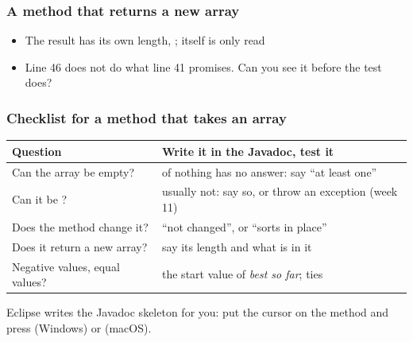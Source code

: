 \documentclass[aspectratio=169,10pt,compress]{beamer}
\begin{document}
\begin{frame}[t,fragile] \frametitle{A method that returns a new array}

	\begin{itemize}\small
		\item The result has its own length, ;  itself is only read
		\item Line 46 does not do what line 41 promises. Can you see it before the test does?
	\end{itemize}
\end{frame}




\begin{frame}[t,fragile] \frametitle{Checklist for a method that takes an array}


\begin{table}
		\small
		\begin{tabular}{@{}L{0.40\textwidth}L{0.52\textwidth}@{}}
			\toprule
			\textbf{Question} & \textbf{Write it in the Javadoc, test it} \\
			\midrule
			Can the array be empty?            &  of nothing has no answer: say ``at least one'' \\
			Can it be ?            & usually not: say so, or throw an exception (week 11) \\
			Does the method change it?         & ``not changed'', or ``sorts  in place'' \\
			Does it return a new array?        & say its length and what is in it \\
			Negative values, equal values?     & the start value of \emph{best so far}; ties \\
			\bottomrule
		\end{tabular}
\end{table}%


	\vspace{0.5em}
	\small Eclipse writes the Javadoc skeleton for you: put the cursor on the method and press
	 (Windows) or  (macOS).
\end{frame}
\end{document}
